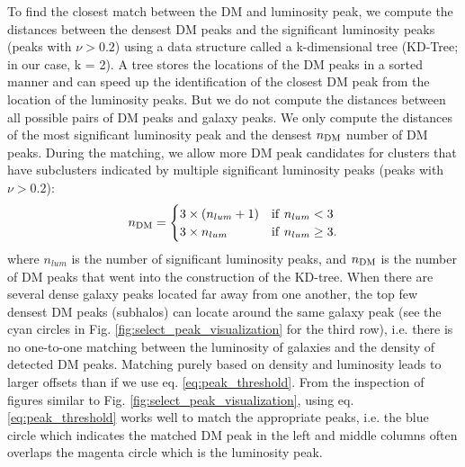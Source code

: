 To find the closest match between the DM and luminosity peak, 
we compute the distances between the densest DM peaks
and the significant luminosity peaks (peaks with $\nu > 0.2$) 
using a data structure called a k-dimensional tree (KD-Tree; in
our case, k = 2). A tree stores the locations of the DM peaks in a sorted
manner and can speed up the identification of the closest DM peak from the
location of the luminosity peaks.
But we do not compute the distances
between all possible pairs of DM peaks and galaxy peaks.  
We only compute the distances of the most significant luminosity peak and 
the densest $n_{\rm DM}$ number of DM peaks. 
During the matching, we allow more DM peak
candidates for clusters that have subclusters indicated by
multiple significant luminosity peaks (peaks with $\nu > 0.2$):
\begin{equation}
	n_{\rm DM} = \begin{cases}		
		3 \times (n_{lum} + 1) & {\rm if~} n_{lum} < 3 \\
	3 \times n_{lum}  & {\rm if~} n_{lum} \geq 3.
	\end{cases}
	\label{eq:peak_threshold}
\end{equation}
where $n_{lum}$ is the number of significant luminosity peaks, and $n_{\rm DM}$
is the number of DM peaks that went into the construction of the KD-tree.
When there are several dense galaxy peaks located far away from one another, 
the top few densest DM peaks (subhalos) can locate around the same galaxy
peak (see the cyan circles in Fig. \ref{fig:select_peak_visualization} for the
third row), i.e. there is no one-to-one matching between the luminosity of 
galaxies and the density of detected DM peaks. 
Matching purely based on density and luminosity leads to larger offsets than if
we use eq. \ref{eq:peak_threshold}.
From the inspection of figures similar to 
Fig. \ref{fig:select_peak_visualization}, 
using eq. \ref{eq:peak_threshold} works well to match the 
appropriate peaks, i.e. the blue circle which indicates the matched DM peak 
in the left and middle columns 
often overlaps the magenta circle which is the luminosity peak.  


